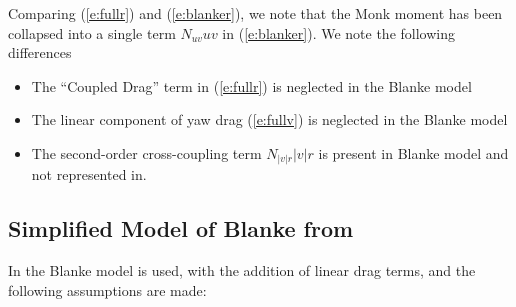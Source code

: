\documentclass[11pt,draftcls,journal,onecolumn]{IEEEtran}
\begin{document}
\noindent
Comparing (\ref{e:fullr}) and (\ref{e:blanker}), we note that the Monk moment has been collapsed into a single term $N_{uv}uv$ in (\ref{e:blanker}).  We note the following differences
\begin{itemize}
\item The ``Coupled Drag'' term in (\ref{e:fullr}) is neglected in the Blanke model
\item The linear component of yaw drag (\ref{e:fullv}) is neglected in the Blanke model
\item The second-order cross-coupling term $N_{|v|r}|v|r$ is present in Blanke model and not represented in.
\end{itemize}

\subsection{Simplified Model of Blanke from \cite{caccia08practical}}
In \cite{caccia08practical} the Blanke model is used, with the addition of linear drag terms, and the following assumptions are made:
\end{document}
